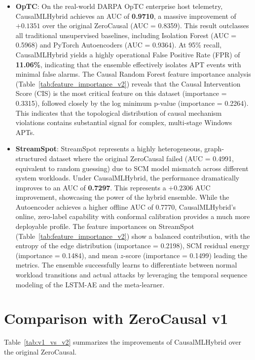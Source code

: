 \begin{itemize}
\item \textbf{OpTC}: On the real-world DARPA OpTC enterprise host telemetry, CausalMLHybrid achieves an AUC of \textbf{0.9710}, a massive improvement of $+0.1351$ over the original ZeroCausal (AUC = 0.8359). This result outclasses all traditional unsupervised baselines, including Isolation Forest (AUC = 0.5968) and PyTorch Autoencoders (AUC = 0.9364). At 95\% recall, CausalMLHybrid yields a highly operational False Positive Rate (FPR) of \textbf{11.06\%}, indicating that the ensemble effectively isolates APT events with minimal false alarms. 
The Causal Random Forest feature importance analysis (Table~\ref{tab:feature_importance_v2}) reveals that the Causal Intervention Score (CIS) is the most critical feature on this dataset (importance = 0.3315), followed closely by the log minimum p-value (importance = 0.2264). This indicates that the topological distribution of causal mechanism violations contains substantial signal for complex, multi-stage Windows APTs.

\item \textbf{StreamSpot}: StreamSpot represents a highly heterogeneous, graph-structured dataset where the original ZeroCausal failed (AUC = 0.4991, equivalent to random guessing) due to SCM model mismatch across different system workloads. Under CausalMLHybrid, the performance dramatically improves to an AUC of \textbf{0.7297}. This represents a $+0.2306$ AUC improvement, showcasing the power of the hybrid ensemble. While the Autoencoder achieves a higher offline AUC of 0.7770, CausalMLHybrid's online, zero-label capability with conformal calibration provides a much more deployable profile.
The feature importances on StreamSpot (Table~\ref{tab:feature_importance_v2}) show a balanced contribution, with the entropy of the edge distribution (importance = 0.2198), SCM residual energy (importance = 0.1484), and mean $z$-score (importance = 0.1499) leading the metrics. The ensemble successfully learns to differentiate between normal workload transitions and actual attacks by leveraging the temporal sequence modeling of the LSTM-AE and the meta-learner.
\end{itemize}


\section{Comparison with ZeroCausal v1}

Table~\ref{tab:v1_vs_v2} summarizes the improvements of CausalMLHybrid over the original ZeroCausal.

